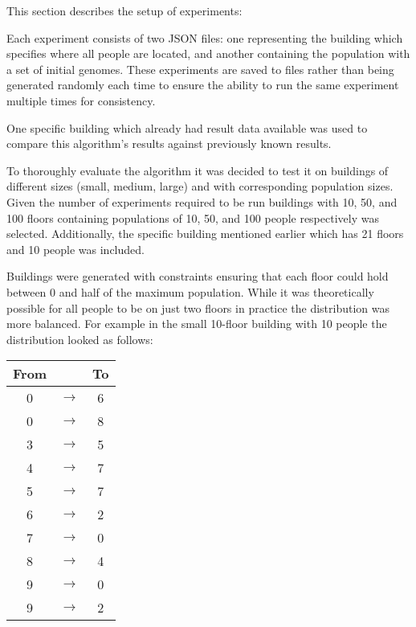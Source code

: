 
This section describes the setup of experiments:

Each experiment consists of two JSON files: one representing the building which specifies where all people are located, and another containing the population with a set of initial genomes.
These experiments are saved to files rather than being generated randomly each time to ensure the ability to run the same experiment multiple times for consistency.

One specific building which already had result data available was used to compare this algorithm's results against previously known results.

To thoroughly evaluate the algorithm it was decided to test it on buildings of different sizes (small, medium, large) and with corresponding population sizes.
Given the number of experiments required to be run buildings with 10, 50, and 100 floors containing populations of 10, 50, and 100 people respectively was selected. Additionally, the specific building mentioned earlier which has 21 floors and 10 people was included.

Buildings were generated with constraints ensuring that each floor could hold between 0 and half of the maximum population.
While it was theoretically possible for all people to be on just two floors in practice the distribution was more balanced. For example in the small 10-floor building with 10 people the distribution looked as follows:

\begin{center}
	\begin{tabular}{c c c}
		\textbf{From} &       & \textbf{To} \\
		\hline
		0             & $\to$ & 6           \\
		0             & $\to$ & 8           \\
		3             & $\to$ & 5           \\
		4             & $\to$ & 7           \\
		5             & $\to$ & 7           \\
		6             & $\to$ & 2           \\
		7             & $\to$ & 0           \\
		8             & $\to$ & 4           \\
		9             & $\to$ & 0           \\
		9             & $\to$ & 2           \\
	\end{tabular}
\end{center}


